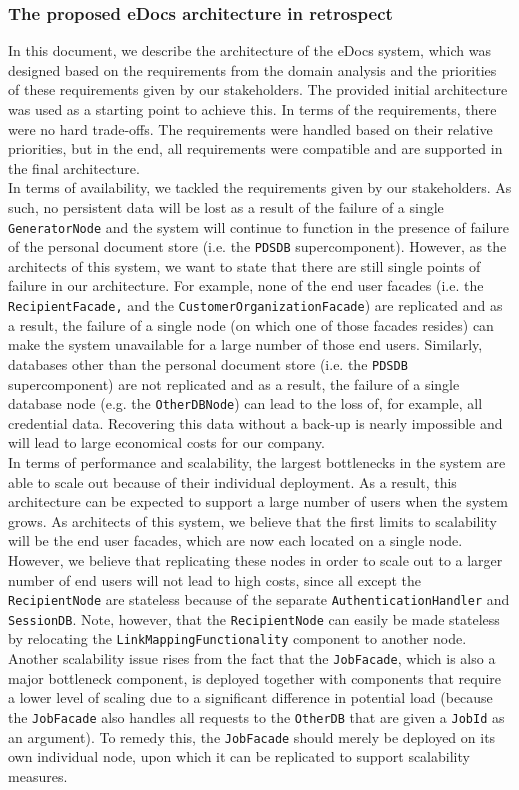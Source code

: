 \documentclass[a4paper,10pt]{article}
\begin{document}
\subsubsection*{The proposed eDocs architecture in retrospect}
In this document, we describe the architecture of the eDocs system, which was designed based on the requirements from the domain analysis and the priorities of these requirements given by our stakeholders. The provided initial architecture was used as a starting point to achieve this. In terms of the requirements, there were no hard trade-offs. The requirements were handled based on their relative priorities, but in the end, all requirements were compatible and are supported in the final architecture.\\
In terms of availability, we tackled the requirements given by our stakeholders. As such, no persistent data will be lost as a result of the failure of a single \texttt{GeneratorNode} and the system will continue to function in the presence of failure of the personal document store (i.e. the \texttt{PDSDB} supercomponent). However, as the architects of this system, we want to state that there are still single points of failure in our architecture. For example, none of the end user facades (i.e. the \texttt{RecipientFacade,} and the \texttt{CustomerOrganizationFacade}) are replicated and as a result, the failure of a single node (on which one of those facades resides) can make the system unavailable for a large number of those end users. Similarly, databases other than the personal document store (i.e. the \texttt{PDSDB} supercomponent) are not replicated and as a result, the failure of a single database node (e.g. the \texttt{OtherDBNode}) can lead to the loss of, for example, all credential data. Recovering this data without a back-up is nearly impossible and will lead to large economical costs for our company.\\
In terms of performance and scalability, the largest bottlenecks in the system are able to scale out because of their individual deployment. As a result, this architecture can be expected to support a large number of users when the system grows. As architects of this system, we believe that the first limits to scalability will be the end user facades, which are now each located on a single node. However, we believe that replicating these nodes in order to scale out to a larger number of end users will not lead to high costs, since all except the \texttt{RecipientNode} are stateless because of the separate \texttt{AuthenticationHandler} and \texttt{SessionDB}. Note, however, that the \texttt{RecipientNode} can easily be made stateless by relocating the \texttt{LinkMappingFunctionality} component to another node. Another scalability issue rises from the fact that the \texttt{JobFacade}, which is also a major bottleneck component, is deployed together with components that require a lower level of scaling due to a significant difference in potential load (because the \texttt{JobFacade} also handles all requests to the \texttt{OtherDB} that are given a \texttt{JobId} as an argument). To remedy this, the \texttt{JobFacade} should merely be deployed on its own individual node, upon which it can be replicated to support scalability measures.\\
\end{document}
